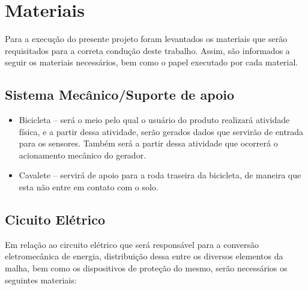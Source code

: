 \chapter[Materiais]{Materiais}

Para a execução do presente projeto foram levantados os materiais que serão requisitados para a correta condução deste trabalho. Assim, são informados a seguir 
os materiais necessários, bem como o papel executado por cada material.

\section{Sistema Mecânico/Suporte de apoio}

\begin{itemize}
\item Bicicleta – será o meio pelo qual o usuário do produto realizará atividade física, e a partir dessa atividade, serão gerados dados que servirão de 
  entrada para os sensores. Também será a partir dessa atividade que ocorrerá o acionamento mecânico do gerador.
\item Cavalete – servirá de apoio para a roda traseira da bicicleta, de maneira que esta não entre em contato com o solo.
\end{itemize}

\section{Cicuito Elétrico}

Em relação ao circuito elétrico que será responsável para a conversão eletromecânica de energia, distribuição dessa entre os diversos elementos da malha, 
bem como os dispositivos de proteção do mesmo, serão necessários os seguintes materiais:


